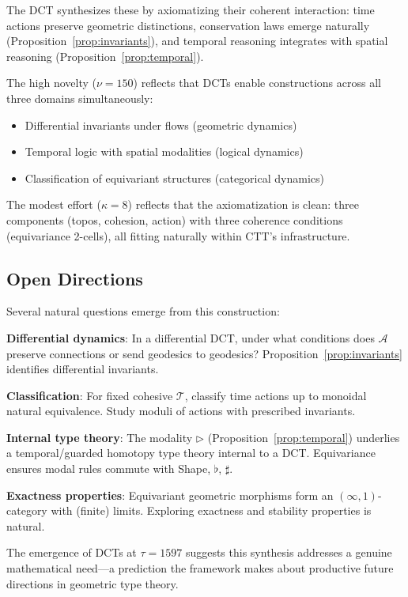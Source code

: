 \documentclass[11pt]{article}
\theoremstyle{definition}
\theoremstyle{plain}
\theoremstyle{remark}
\begin{document}
The DCT synthesizes these by axiomatizing their coherent interaction: time actions preserve geometric distinctions, conservation laws emerge naturally (Proposition~\ref{prop:invariants}), and temporal reasoning integrates with spatial reasoning (Proposition~\ref{prop:temporal}).

The high novelty ($\nu = 150$) reflects that DCTs enable constructions across all three domains simultaneously:
\begin{itemize}
\item Differential invariants under flows (geometric dynamics)
\item Temporal logic with spatial modalities (logical dynamics)
\item Classification of equivariant structures (categorical dynamics)
\end{itemize}

The modest effort ($\kappa = 8$) reflects that the axiomatization is clean: three components (topos, cohesion, action) with three coherence conditions (equivariance 2-cells), all fitting naturally within CTT's infrastructure.

\subsection{Open Directions}

Several natural questions emerge from this construction:

\textbf{Differential dynamics}: In a differential DCT, under what conditions does $\mathcal{A}$ preserve connections or send geodesics to geodesics? Proposition~\ref{prop:invariants} identifies differential invariants.

\textbf{Classification}: For fixed cohesive $\mathcal{T}$, classify time actions up to monoidal natural equivalence. Study moduli of actions with prescribed invariants.

\textbf{Internal type theory}: The modality $\triangleright$ (Proposition~\ref{prop:temporal}) underlies a temporal/guarded homotopy type theory internal to a DCT. Equivariance ensures modal rules commute with Shape, $\flat$, $\sharp$.

\textbf{Exactness properties}: Equivariant geometric morphisms form an $(\infty,1)$-category with (finite) limits. Exploring exactness and stability properties is natural.

The emergence of DCTs at $\tau = 1597$ suggests this synthesis addresses a genuine mathematical need—a prediction the framework makes about productive future directions in geometric type theory.
\end{document}
